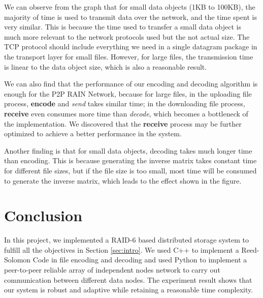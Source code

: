 \documentclass[conference]{IEEEtran}
\begin{document}
We can observe from the graph that for small data objects (1KB to 100KB), the majority of time is used to transmit data over the network, and the time spent is very similar. This is because the time used to transfer a small data object is much more relevant to the network protocols used but the not actual size. The TCP protocol should include everything we need in a single datagram package in the transport layer for small files. However, for large files, the transmission time is linear to the data object size, which is also a reasonable result. 

We can also find that the performance of our encoding and decoding algorithm is enough for the P2P RAIN Network, because for large files, in the uploading file process, \textbf{encode} and \textit{send} takes similar time; in the downloading file process, \textbf{receive} even consumes more time than \textit{decode}, which becomes a bottleneck of the implementation. We discovered that the \textbf{receive} process may be further optimized to achieve a better performance in the system. 

Another finding is that for small data objects, decoding takes much longer time than encoding. This is because generating the inverse matrix takes constant time for different file sizes, but if the file size is too small, most time will be consumed to generate the inverse matrix, which leads to the effect shown in the figure.

\section{Conclusion}

In this project, we implemented a RAID-6 based distributed storage system to fulfill all the objectives in Section \ref{sec:intro}. We used C++ to implement a Reed-Solomon Code in file encoding and decoding and used Python to implement a peer-to-peer reliable array of independent nodes network to carry out communication between different data nodes. The experiment result shows that our system is robust and adaptive while retaining a reasonable time complexity.



\end{document}
